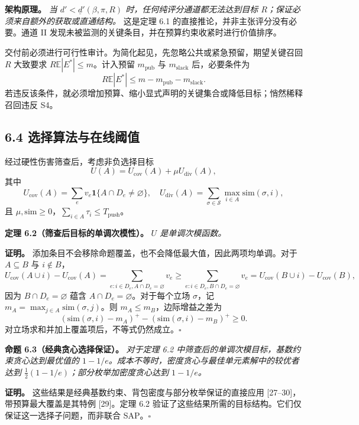 \documentclass[
  chinese,
  11pt]{article}
\begin{document}
\textbf{架构原理。} \emph{当 \(d'<\underline d'(\beta,\pi,R)\) 时，任何纯评分通道都无法达到目标 \(R\)；保证必须来自额外的获取或直通结构。} 这是定理 6.1 的直接推论，并非主张评分没有必要。通道 II 发现未被监测的关键条目，并在预算约束收紧时进行价值排序。

交付前必须进行可行性审计。为简化起见，先忽略公共或紧急预留，期望关键召回 \(R\) 大致要求 \(R\mathbb E|E^*|\leq m\)。计入预留 \(m_{\mathrm{pub}}\) 与 \(m_{\mathrm{slack}}\) 后，必要条件为 \[
R\mathbb E|E^*|\leq m-m_{\mathrm{pub}}-m_{\mathrm{slack}}.
\tag{11}
\] 若违反该条件，就必须增加预算、缩小显式声明的关键集合或降低目标；悄然稀释召回违反 S4。

\subsection{6.4 选择算法与在线阈值}\label{ux9009ux62e9ux7b97ux6cd5ux4e0eux5728ux7ebfux9608ux503c}

经过硬性伤害筛查后，考虑非负选择目标 \[
U(A)=U_{\mathrm{cov}}(A)+\mu U_{\mathrm{div}}(A),
\] 其中 \[
U_{\mathrm{cov}}(A)=\sum_ev_e\mathbf 1\{A\cap D_e\neq\varnothing\},
\quad
U_{\mathrm{div}}(A)=\sum_{\sigma\in\mathcal S}\max_{i\in A}\mathrm{sim}(\sigma,i),
\] 且 \(\mu,\mathrm{sim}\geq0\)，\(\sum_{i\in A}\tau_i\leq T_{\mathrm{push}}\)。

\textbf{定理 6.2（筛查后目标的单调次模性）。} \emph{\(U\) 是单调次模函数。}

\textbf{证明。} 添加条目不会移除命题覆盖，也不会降低最大值，因此两项均单调。对于 \(A\subseteq B\) 与 \(i\notin B\)， \[
U_{\mathrm{cov}}(A\cup i)-U_{\mathrm{cov}}(A)
=\sum_{e:i\in D_e,A\cap D_e=\varnothing}v_e
\geq\sum_{e:i\in D_e,B\cap D_e=\varnothing}v_e
=U_{\mathrm{cov}}(B\cup i)-U_{\mathrm{cov}}(B),
\] 因为 \(B\cap D_e=\varnothing\) 蕴含 \(A\cap D_e=\varnothing\)。对于每个立场 \(\sigma\)，记 \(m_A=\max_{j\in A}\mathrm{sim}(\sigma,j)\)。则 \(m_A\leq m_B\)，边际增益之差为 \[
(\mathrm{sim}(\sigma,i)-m_A)^+-(\mathrm{sim}(\sigma,i)-m_B)^+\geq0.
\] 对立场求和并加上覆盖项后，不等式仍然成立。\(\square\)

\textbf{命题 6.3（经典贪心选择保证）。} \emph{对于定理 6.2 中筛查后的单调次模目标，基数约束贪心达到最优值的 \(1-1/e\)。成本不等时，密度贪心与最佳单元素解中的较优者达到 \(\tfrac12(1-1/e)\)；部分枚举加密度贪心达到 \(1-1/e\)。}

\textbf{证明。} 这些结果是经典基数约束、背包密度与部分枚举保证的直接应用 {[}27--30{]}，带预算最大覆盖是其特例 {[}29{]}。定理 6.2 验证了这些结果所需的目标结构。它们仅保证这一选择子问题，而非联合 SAP。\(\square\)
\end{document}
